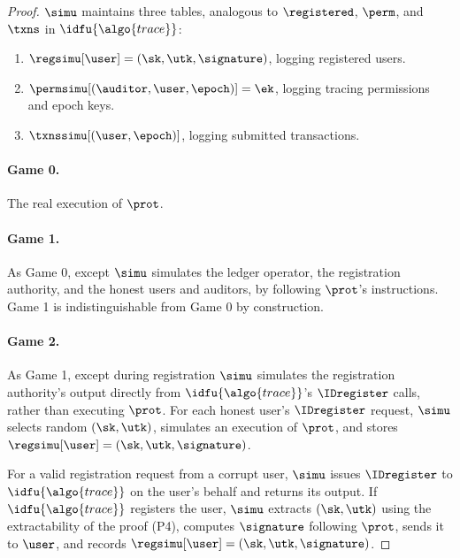 \begin{proof}

  $\simu$ maintains three tables, analogous to $\registered$, $\perm$, and $\txns$ in
$\idfu{\algo{trace}}$:

  \begin{enumerate}

    \item $\regsimu[\user] = (\sk, \utk, \signature)$, logging registered users.

    \item $\permsimu[(\auditor,\user,\epoch)] = \ek$, logging tracing
permissions and epoch keys.

    \item $\txnssimu[(\user,\epoch)]$, logging submitted transactions.

  \end{enumerate}

  \paragraph{Game 0.} The real execution of $\prot$.

  \paragraph{Game 1.} As Game 0, except $\simu$ simulates the ledger
operator, the registration authority, and the honest users and auditors, by
following $\prot$'s instructions. Game 1 is indistinguishable
from Game 0 by construction.

  \paragraph{Game 2.} As Game 1, except during registration $\simu$ simulates
the registration authority's output directly from $\idfu{\algo{trace}}$'s
$\IDregister$ calls, rather than executing $\prot$. For each honest user's
$\IDregister$ request, $\simu$ selects random $(\sk, \utk)$, simulates an
execution of $\prot$, and stores $\regsimu[\user] = (\sk, \utk, \signature)$.

  For a valid registration request from a corrupt user, $\simu$ issues
$\IDregister$ to $\idfu{\algo{trace}}$ on the user's behalf and returns its
output.  If $\idfu{\algo{trace}}$ registers the user, $\simu$ extracts $(\sk,
\utk)$ using the extractability of the proof (P4), computes $\signature$
following $\prot$, sends it to $\user$, and records $\regsimu[\user] = (\sk, \utk,
\signature)$.


\end{proof}

